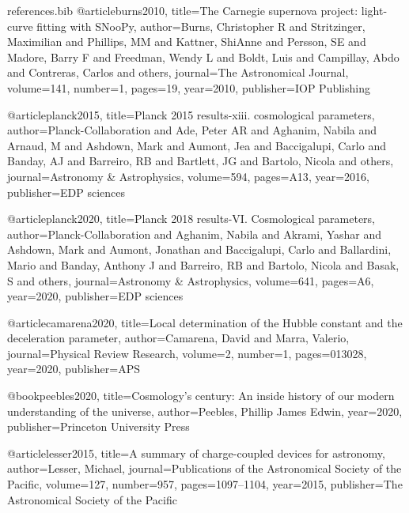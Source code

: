 \begin{filecontents}{references.bib}
@article{burns2010,
  title={The Carnegie supernova project: light-curve fitting with SNooPy},
  author={Burns, Christopher R and Stritzinger, Maximilian and Phillips, MM and Kattner, ShiAnne and Persson, SE and Madore, Barry F and Freedman, Wendy L and Boldt, Luis and Campillay, Abdo and Contreras, Carlos and others},
  journal={The Astronomical Journal},
  volume={141},
  number={1},
  pages={19},
  year={2010},
  publisher={IOP Publishing}
}

@article{planck2015,
  title={Planck 2015 results-xiii. cosmological parameters},
  author={Planck-Collaboration and Ade, Peter AR and Aghanim, Nabila and Arnaud, M and Ashdown, Mark and Aumont, Jea and Baccigalupi, Carlo and Banday, AJ and Barreiro, RB and Bartlett, JG and Bartolo, Nicola and others},
  journal={Astronomy \& Astrophysics},
  volume={594},
  pages={A13},
  year={2016},
  publisher={EDP sciences}
}

@article{planck2020,
  title={Planck 2018 results-VI. Cosmological parameters},
  author={Planck-Collaboration and Aghanim, Nabila and Akrami, Yashar and Ashdown, Mark and Aumont, Jonathan and Baccigalupi, Carlo and Ballardini, Mario and Banday, Anthony J and Barreiro, RB and Bartolo, Nicola and Basak, S and others},
  journal={Astronomy \& Astrophysics},
  volume={641},
  pages={A6},
  year={2020},
  publisher={EDP sciences}
}

@article{camarena2020,
  title={Local determination of the Hubble constant and the deceleration parameter},
  author={Camarena, David and Marra, Valerio},
  journal={Physical Review Research},
  volume={2},
  number={1},
  pages={013028},
  year={2020},
  publisher={APS}
}

@book{peebles2020,
  title={Cosmology’s century: An inside history of our modern understanding of the universe},
  author={Peebles, Phillip James Edwin},
  year={2020},
  publisher={Princeton University Press}
}

@article{lesser2015,
  title={A summary of charge-coupled devices for astronomy},
  author={Lesser, Michael},
  journal={Publications of the Astronomical Society of the Pacific},
  volume={127},
  number={957},
  pages={1097--1104},
  year={2015},
  publisher={The Astronomical Society of the Pacific}
}
\end{filecontents}

\documentclass[aps,prl,reprint,amsmath,floatfix]{revtex4-2}

\usepackage{graphicx}
\usepackage{relsize}



